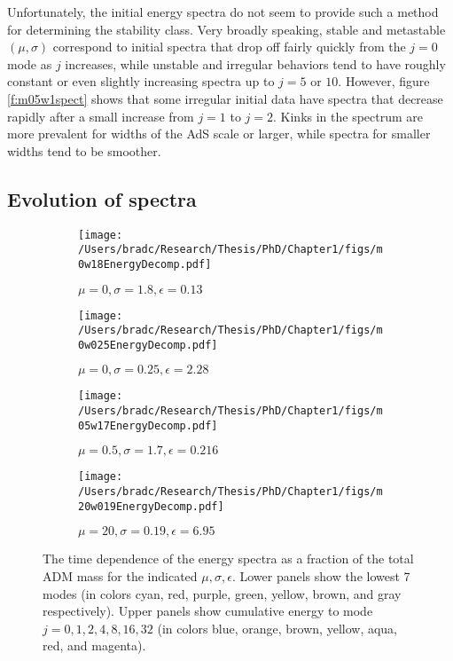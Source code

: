 \documentclass[../PhD.tex]{subfiles}
\begin{document}
Unfortunately, the initial energy spectra do not seem to provide such a
method for determining the stability class.  Very broadly speaking, stable
and metastable $(\mu,\sigma)$ correspond to initial spectra that drop off
fairly quickly from the $j=0$ mode as $j$ increases, while unstable and
irregular behaviors tend to have roughly constant or even slightly increasing
spectra up to $j=5$ or $10$.  However, figure \ref{f:m05w1spect} shows that
some irregular initial data have spectra that decrease rapidly after a small
increase from $j=1$ to $j=2$.  Kinks in the spectrum are more prevalent for
widths of the AdS scale or larger, while spectra for smaller widths tend
to be smoother.




\subsection{Evolution of spectra}
\begin{figure}[!t]
\centering
\begin{subfigure}[t]{0.47\textwidth}
\texttt{[image: /Users/bradc/Research/Thesis/PhD/Chapter1/figs/m0w18EnergyDecomp.pdf]}
\caption{$\mu=0,\sigma=1.8,\epsilon=0.13$}
\label{f:m0w18decomp}
\end{subfigure}
\begin{subfigure}[t]{0.47\textwidth}
\texttt{[image: /Users/bradc/Research/Thesis/PhD/Chapter1/figs/m0w025EnergyDecomp.pdf]}
\caption{$\mu=0,\sigma=0.25,\epsilon=2.28$}
\label{f:m0w025decomp}
\end{subfigure}
\begin{subfigure}[t]{0.47\textwidth}
\texttt{[image: /Users/bradc/Research/Thesis/PhD/Chapter1/figs/m05w17EnergyDecomp.pdf]}
\caption{$\mu=0.5,\sigma=1.7,\epsilon=0.216$}
\label{f:m05w17decomp}
\end{subfigure}
\begin{subfigure}[t]{0.47\textwidth}
\texttt{[image: /Users/bradc/Research/Thesis/PhD/Chapter1/figs/m20w019EnergyDecomp.pdf]}
\caption{$\mu=20,\sigma=0.19,\epsilon=6.95$}
\label{f:m20w019decomp}
\end{subfigure}
\caption[Evolution of the energy spectra]{The time dependence of the energy spectra as a fraction of the
total ADM mass for the indicated
$\mu,\sigma,\epsilon$.  Lower panels show the lowest 7 modes (in colors
cyan, red, purple, green, yellow, brown, and gray
respectively).  Upper panels show cumulative energy to mode
$j=0,1,2,4,8,16,32$ (in colors blue, orange, brown, yellow, aqua, red, and
magenta). }
\label{f:evolvingspectra}
\end{figure}
\end{document}
